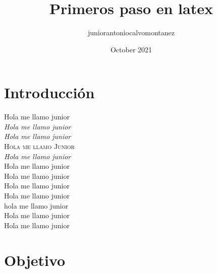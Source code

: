 \documentclass[12pt, a4paper]{article}
\title{Primeros paso en latex}
\author{juniorantoniocalvomontanez }
\date{October 2021}
\begin{document}
\maketitle %

\section{Introducción}
        \noindent
    {Hola me llamo junior}\\
    \textit{Hola me llamo junior}\\
    \textsl{Hola me llamo junior}\\
    \textsc{Hola me llamo Junior}\\
    \emph{Hola me llamo junior}\\
    
    \noindent
    {\scriptsize Hola me llamo junior}\\
    {\footnotesize Hola me llamo junior}\\
    {\small Hola me llamo junior}\\
    
    {Hola me llamo junior}\\
    {\large hola me llamo junior}\\
    {\Large Hola me llamo junior}\\
    {\LARGE Hola me llamo junior}\\
\section{Objetivo}
\lipsum[7]
\end{document}
